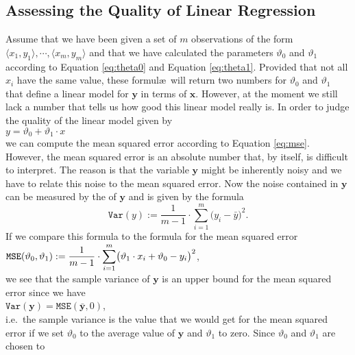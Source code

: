 \subsection{Assessing the Quality of Linear Regression}
Assume that we have been given a set of $m$ observations of the form $\langle x_1, y_1\rangle, \cdots, \langle x_m, y_m\rangle$  
and that we have calculated the parameters $\vartheta_0$ and $\vartheta_1$ according to Equation
\ref{eq:theta0} and Equation \ref{eq:theta1}.  Provided that not all $x_i$ have the same value, these
formul\ae\ will return two numbers for $\vartheta_0$ and $\vartheta_1$ that define a linear model for
$\mathbf{y}$ in terms of $\mathbf{x}$.  However, at the moment we still lack a number that tells us how good
this linear model really is.  In order to judge the quality of the linear model given by 
\\[0.2cm]
\hspace*{1.3cm}
$y = \vartheta_0 + \vartheta_1 \cdot x$
\\[0.2cm]
we can compute the mean squared error according to Equation \ref{eq:mse}.  However, the mean squared error 
is an absolute number that, by itself, is difficult to interpret.  The reason is that the variable $\mathbf{y}$ might be
inherently noisy and we have to relate this noise to the mean squared error.  Now the noise contained in $\mathbf{y}$
can be measured by the  of $\mathbf{y}$ and is given by the formula
\begin{equation}
  \label{eq:var}
  \mathtt{Var}(y) := \frac{1}{m-1} \cdot \sum\limits_{i=1}^m \bigl(y_i - \bar{y}\bigr)^2.
\end{equation}
If we compare this formula to the formula for the mean squared error
\\[0.2cm]
\hspace*{1.3cm}
$\displaystyle\mathtt{MSE}(\vartheta_0, \vartheta_1) := 
  \frac{1}{m-1} \cdot\sum\limits_{i=1}^m \bigl(\vartheta_1 \cdot x_i + \vartheta_0 - y_i\bigr)^2
$,
\\[0.2cm]
we see that the sample variance of $\mathbf{y}$ is an upper bound for the mean squared error since we have
\\[0.2cm]
\hspace*{1.3cm}
$\mathtt{Var}(\mathbf{y}) = \mathtt{MSE}(\bar{\mathbf{y}}, 0)$,
\\[0.2cm]
i.e.~the sample variance is the value that we would get for the mean squared error if we set $\vartheta_0$ to
the average value of $\mathbf{y}$ and $\vartheta_1$ to zero.  Since $\vartheta_0$ and $\vartheta_1$ are chosen to
